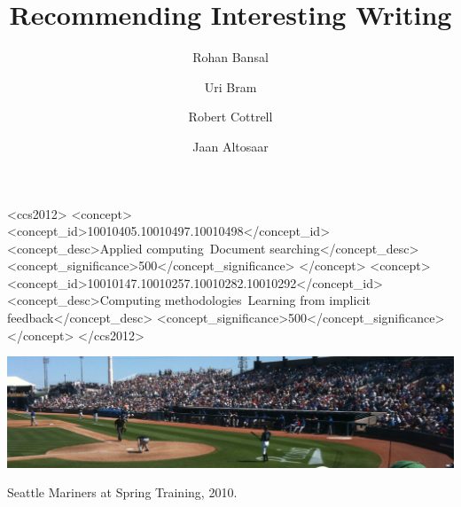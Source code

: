 \documentclass[sigconf]{acmart} %
\title{Recommending Interesting Writing}
\author{Rohan Bansal}
\affiliation{\institution{The Browser}}
\author{Uri Bram}
\affiliation{\institution{The Browser}}
\author{Robert Cottrell}
\affiliation{\institution{The Browser}}
\author{Jaan Altosaar}
\affiliation{\institution{Princeton University}}
\begin{document}

\begin{CCSXML}
<ccs2012>
   <concept>
       <concept_id>10010405.10010497.10010498</concept_id>
       <concept_desc>Applied computing~Document searching</concept_desc>
       <concept_significance>500</concept_significance>
       </concept>
   <concept>
       <concept_id>10010147.10010257.10010282.10010292</concept_id>
       <concept_desc>Computing methodologies~Learning from implicit feedback</concept_desc>
       <concept_significance>500</concept_significance>
       </concept>
 </ccs2012>
\end{CCSXML}



\begin{teaserfigure}
  \includegraphics[width=\textwidth]{sampleteaser}
  \caption{Seattle Mariners at Spring Training, 2010.}
  \label{fig:teaser}
\end{teaserfigure}

\maketitle
% 
% 
% 
% 
% 


\end{document}
